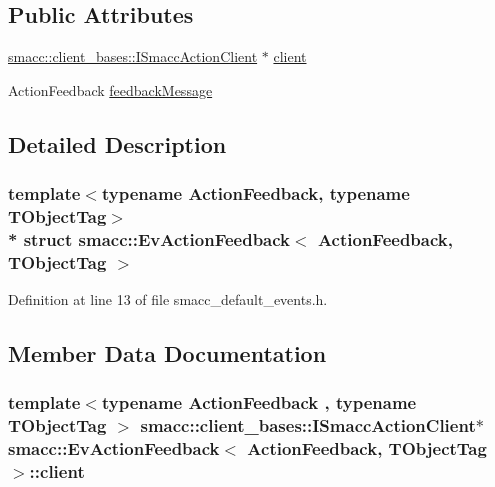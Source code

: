 \subsection*{Public Attributes}
\begin{DoxyCompactItemize}
\item 
\hyperlink{classsmacc_1_1client__bases_1_1ISmaccActionClient}{smacc\+::client\+\_\+bases\+::\+I\+Smacc\+Action\+Client} $\ast$ \hyperlink{structsmacc_1_1EvActionFeedback_a4b5ac0e612b0a1bd2cea746dad8194b1}{client}
\item 
Action\+Feedback \hyperlink{structsmacc_1_1EvActionFeedback_ae00f5e85eb9cec0d02ca394460d60015}{feedback\+Message}
\end{DoxyCompactItemize}


\subsection{Detailed Description}
\subsubsection*{template$<$typename Action\+Feedback, typename T\+Object\+Tag$>$\\*
struct smacc\+::\+Ev\+Action\+Feedback$<$ Action\+Feedback, T\+Object\+Tag $>$}



Definition at line 13 of file smacc\+\_\+default\+\_\+events.\+h.



\subsection{Member Data Documentation}
\subsubsection[{\texorpdfstring{client}{client}}]{\setlength{\rightskip}{0pt plus 5cm}template$<$typename Action\+Feedback , typename T\+Object\+Tag $>$ {\bf smacc\+::client\+\_\+bases\+::\+I\+Smacc\+Action\+Client}$\ast$ {\bf smacc\+::\+Ev\+Action\+Feedback}$<$ Action\+Feedback, T\+Object\+Tag $>$\+::client}\hypertarget{structsmacc_1_1EvActionFeedback_a4b5ac0e612b0a1bd2cea746dad8194b1}{}\label{structsmacc_1_1EvActionFeedback_a4b5ac0e612b0a1bd2cea746dad8194b1}


